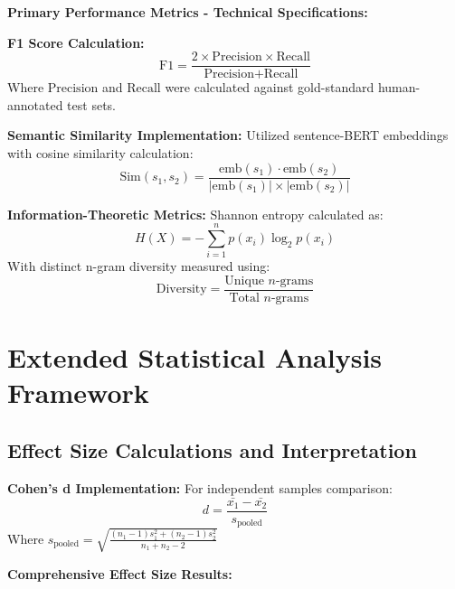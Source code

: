 \documentclass{article}
\begin{document}
\textbf{Primary Performance Metrics - Technical Specifications:}

\textbf{F1 Score Calculation:}
\begin{equation}
\text{F1} = \frac{2 \times \text{Precision} \times \text{Recall}}{\text{Precision} + \text{Recall}}
\end{equation}
Where $\text{Precision}$ and $\text{Recall}$ were calculated against gold-standard human-annotated test sets.

\textbf{Semantic Similarity Implementation:}
Utilized sentence-BERT embeddings with cosine similarity calculation:
\begin{equation}
\text{Sim}(s_1, s_2) = \frac{\text{emb}(s_1) \cdot \text{emb}(s_2)}{|\text{emb}(s_1)| \times |\text{emb}(s_2)|}
\end{equation}

\textbf{Information-Theoretic Metrics:}
Shannon entropy calculated as:
\begin{equation}
H(X) = -\sum_{i=1}^{n} p(x_i) \log_2 p(x_i)
\end{equation}
With distinct n-gram diversity measured using:
\begin{equation}
\text{Diversity} = \frac{\text{Unique $n$-grams}}{\text{Total $n$-grams}}
\end{equation}

\section{Extended Statistical Analysis Framework}
\label{appendix:statistical_methods}

\subsection{Effect Size Calculations and Interpretation}

\textbf{Cohen's d Implementation:}
For independent samples comparison:
\begin{equation}
d = \frac{\bar{x_1} - \bar{x_2}}{s_{\text{pooled}}}
\end{equation}
Where $s_{\text{pooled}} = \sqrt{\frac{(n_1-1)s_1^2 + (n_2-1)s_2^2}{n_1 + n_2 - 2}}$

\textbf{Comprehensive Effect Size Results:}
\end{document}
